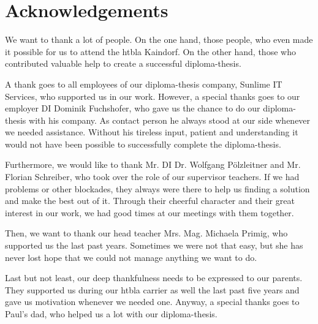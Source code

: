 \chapter*{Acknowledgements}
We want to thank a lot of people. On the one hand, those people, who even made it possible for us to attend the \gls{htbla} Kaindorf. On the other hand, those who contributed valuable help to create a successful diploma-thesis.

A thank goes to all employees of our diploma-thesis company, Sunlime IT Services, who supported us in our work. However, a special thanks goes to our employer DI Dominik Fuchshofer, who gave us the chance to do our diploma-thesis with his company. As contact person he always stood at our side whenever we needed assistance. Without his tireless input, patient and understanding it would not have been possible to successfully complete the diploma-thesis.

Furthermore, we would like to thank Mr. DI Dr. Wolfgang Pölzleitner and Mr. Florian Schreiber, who took over the role of our supervisor teachers. If we had problems or other blockades, they always were there to help us finding a solution and make the best out of it. Through their cheerful character and their great interest in our work, we had good times at our meetings with them together.

Then, we want to thank our head teacher Mrs. Mag. Michaela Primig, who supported us the last past years. Sometimes we were not that easy, but she has never lost hope that we could not manage anything we want to do.

Last but not least, our deep thankfulness needs to be expressed to our parents. They supported us during our \gls{htbla} carrier as well the last past five years and gave us motivation whenever we needed one. Anyway, a special thanks goes to Paul’s dad, who helped us a lot with our diploma-thesis.
